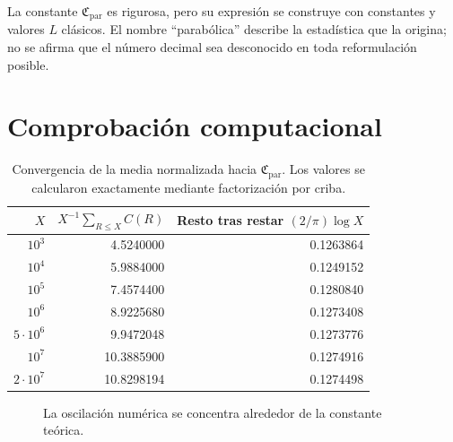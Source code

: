 \documentclass[11pt,a4paper,openany]{report}
\begin{document}
\begin{classicalbox}
La constante \(\mathfrak C_{\mathrm{par}}\) es rigurosa, pero su expresión se construye con constantes y valores \(L\) clásicos. El nombre ``parabólica'' describe la estadística que la origina; no se afirma que el número decimal sea desconocido en toda reformulación posible.
\end{classicalbox}

\section{Comprobación computacional}

\begin{table}[H]
\centering
\caption{Convergencia de la media normalizada hacia \(\mathfrak C_{\mathrm{par}}\). Los valores se calcularon exactamente mediante factorización por criba.}
\begin{tabular}{rrr}
\toprule
\(X\)&\(X^{-1}\sum_{R\le X}C(R)\)&Resto tras restar \((2/\pi)\log X\)\\
\midrule
\(10^3\)&4.5240000&0.1263864\\
\(10^4\)&5.9884000&0.1249152\\
\(10^5\)&7.4574400&0.1280840\\
\(10^6\)&8.9225680&0.1273408\\
\(5\cdot10^6\)&9.9472048&0.1273776\\
\(10^7\)&10.3885900&0.1274916\\
\(2\cdot10^7\)&10.8298194&0.1274498\\
\bottomrule
\end{tabular}
\label{tab:Cpar-convergence}
\end{table}

\begin{figure}[H]
\centering
{}
\caption{La oscilación numérica se concentra alrededor de la constante teórica.}
\label{fig:Cpar-convergence}
\end{figure}
\end{document}
